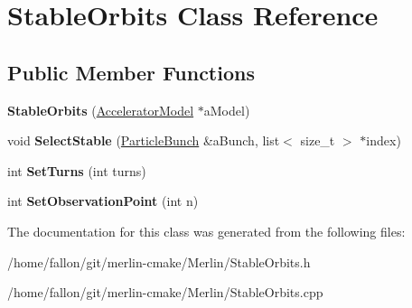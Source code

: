 \hypertarget{classStableOrbits}{}\section{Stable\+Orbits Class Reference}
\label{classStableOrbits}
\subsection*{Public Member Functions}
\begin{DoxyCompactItemize}
\item 
\mbox{\label{classStableOrbits_adc22d5b010726140342f489ae1dbdeb0}} 
{\bfseries Stable\+Orbits} (\hyperlink{classAcceleratorModel}{Accelerator\+Model} $\ast$a\+Model)
\item 
\mbox{\label{classStableOrbits_a8803774adaf06714d37928b7328df56a}} 
void {\bfseries Select\+Stable} (\hyperlink{classParticleTracking_1_1ParticleBunch}{Particle\+Bunch} \&a\+Bunch, list$<$ size\+\_\+t $>$ $\ast$index)
\item 
\mbox{\label{classStableOrbits_a0a67caca85f091dd5942da1da7f44833}} 
int {\bfseries Set\+Turns} (int turns)
\item 
\mbox{\label{classStableOrbits_afbce827e3e7e07af9374cccb1421c527}} 
int {\bfseries Set\+Observation\+Point} (int n)
\end{DoxyCompactItemize}


The documentation for this class was generated from the following files\+:\begin{DoxyCompactItemize}
\item 
/home/fallon/git/merlin-\/cmake/\+Merlin/Stable\+Orbits.\+h\item 
/home/fallon/git/merlin-\/cmake/\+Merlin/Stable\+Orbits.\+cpp\end{DoxyCompactItemize}
